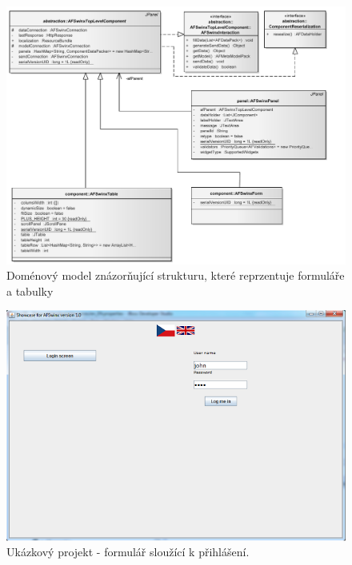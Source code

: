 \documentclass[11pt,twoside,a4paper]{book}
\begin{document}
\begin{figure}
\begin{center}
\includegraphics[angle=270]{images/clientModel}
\caption{Doménový model znázorňující strukturu, které reprzentuje formuláře a tabulky}
\label{img:clientModel}
\end{center}
\end{figure}	

\begin{figure}
\includegraphics{images/login}
\caption{Ukázkový projekt - formulář sloužící k přihlášení.}
\label{img:loginView}
\end{figure}	
\end{document}
